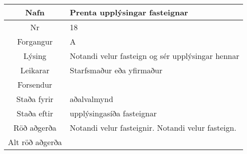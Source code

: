 \documentclass[a4paper]{article}
\begin{document}
\begin{tabular}{|c|p{10cm}|}
\hline
Nafn&Prenta upplýsingar fasteignar\\
\hline
Nr&18\\
\hline
Forgangur&A\\
\hline
Lýsing&Notandi velur fasteign og sér upplýsingar hennar\\
\hline
Leikarar&Starfsmaður eða yfirmaður\\
\hline
Forsendur&\\
\hline
Staða fyrir&aðalvalmynd\\
\hline
Staða eftir&upplýsingasíða fasteignar\\
\hline
Röð aðgerða&Notandi velur fasteignir. Notandi velur fasteign.\\
\hline
Alt röð aðgerða&\\
\hline
\end{tabular}
\end{document}
